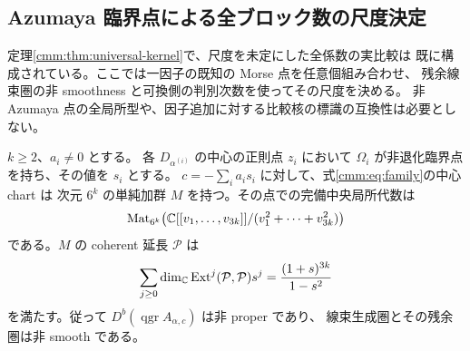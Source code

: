\subsection{Azumaya 臨界点による全ブロック数の尺度決定}
\label{mcs:subsec:scale}

定理\ref{cmm:thm:universal-kernel}で、尺度を未定にした全係数の実比較は
既に構成されている。ここでは一因子の既知の Morse 点を任意個組み合わせ、
残余線束圏の非 smoothness と可換側の判別次数を使ってその尺度を決める。
非 Azumaya 点の全局所型や、因子追加に対する比較核の標識の互換性は必要としない。

\begin{lemma}
\label{mcs:lem:azumaya-morse-detection}
$k\ge2$、$a_i\ne0$ とする。
各 $D_{\alpha^{(i)}}$ の中心の正則点 $z_i$ において
$\Omega_i$ が非退化臨界点を持ち、その値を $s_i$ とする。
$c=-\sum_i a_is_i$ に対して、式\eqref{cmm:eq:family}の中心 chart は
次元 $6^k$ の単純加群 $M$ を持つ。その点での完備中央局所代数は
\begin{equation}\label{mcs:eq:matrix-node}
 \operatorname{Mat}_{6^k}\!\left(
 \mathbb C[[v_1,\ldots,v_{3k}]]/(v_1^2+\cdots+v_{3k}^2)\right)
\end{equation}
である。$M$ の coherent 延長 $\mathcal P$ は
\begin{equation}\label{mcs:eq:self-ext}
 \sum_{j\ge0}\dim_\mathbb C\operatorname{Ext}^j(\mathcal P,\mathcal P)s^j
       =\frac{(1+s)^{3k}}{1-s^2}
\end{equation}
を満たす。従って $D^b(\operatorname{qgr}A_{\alpha,c})$ は非 proper であり、
線束生成圏とその残余圏は非 smooth である。
\end{lemma}


